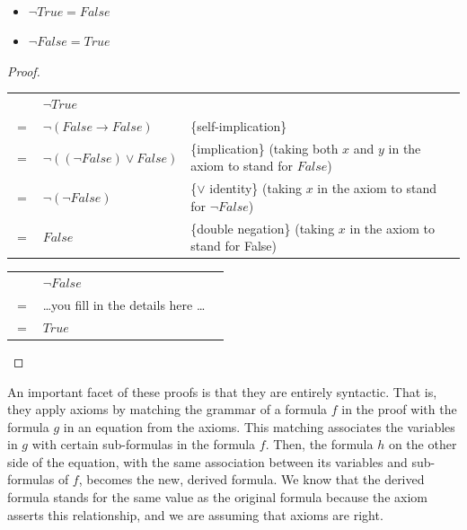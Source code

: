 \begin{theorem}
\mbox{}\\
\begin{itemize}
\item $\neg True = False$
\item $\neg False = True$
\end{itemize}
\end{theorem}
\begin{proof}
\mbox{} \\
\begin{tabular}{llp{3.15in}}
    & $\neg True$                      & \\
$=$ & $\neg (False \rightarrow False)$ & \{self-implication\} \\
$=$ & $\neg ((\neg False) \vee False)$ & \{implication\} (taking both $x$ and $y$ in the axiom to stand for $False$) \\
$=$ & $\neg (\neg False)$              & \{$\vee$ identity\} (taking $x$ in the axiom to stand for $\neg False$) \\
$=$ & $False$                          & \{double negation\} (taking $x$ in the axiom to stand for False) \\
\end{tabular}

\bigskip
\noindent
\begin{tabular}{lll}
    & $\neg False$                             & \\
$=$ & \dots you fill in the details here \dots & \\
$=$ & $True$                                   & \\
\end{tabular}

\end{proof}

An important facet of these proofs is that they are
entirely syntactic. That is, they apply axioms by
matching the grammar of a formula $f$ in the proof with the formula $g$ in an equation from the axioms.
This matching associates the variables in $g$ with certain sub-formulas in the formula $f$. Then, the formula $h$ on the other side of
the equation, with the same association between its variables and sub-formulas of $f$, becomes the new, derived formula.
We know that the derived formula stands for the same value as the original formula because the axiom asserts this relationship, and we are assuming that axioms are right.

